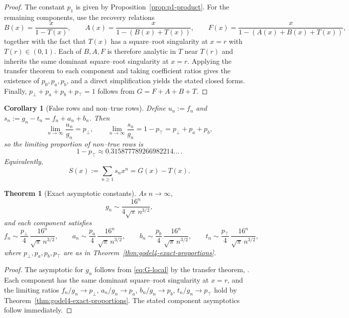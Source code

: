 \documentclass[11pt]{article}
\newtheorem{corollary}{Corollary}
\newtheorem{theorem}{Theorem}
\newcommand{\ptop}{p_{\top}}
\newcommand{\pbot}{p_{\bot}}
\begin{document}
\begin{proof}
The constant \(p_1\) is given by Proposition~\ref{prop:p1-product}.
For the remaining components, use the recovery relations
\[
B(x)=\frac{x}{1-T(x)},\qquad
A(x)=\frac{x}{1-(B(x)+T(x))},\qquad
F(x)=\frac{x}{1-(A(x)+B(x)+T(x))},
\]
together with the fact that \(T(x)\) has a square--root singularity at \(x=r\) with
\(T(r)\in(0,1)\). Each of \(B,A,F\) is therefore analytic in \(T\) near \(T(r)\) and inherits
the same dominant square--root singularity at \(x=r\). Applying the transfer theorem to
each component and taking coefficient ratios gives the existence of \(p_0,p_a,p_b\), and a
direct simplification yields the stated closed forms. Finally,
\(\pbot +p_a+p_b+\ptop =1\) follows from \(G=F+A+B+T\).
\end{proof}

\begin{corollary}[False rows and non--true rows]\label{cor:false-rows-godel4}
Define \(u_n:=f_n\) and \(s_n:=g_n-t_n=f_n+a_n+b_n\). Then
\[
\lim_{n\to\infty}\frac{u_n}{g_n}=\pbot,
\qquad
\lim_{n\to\infty}\frac{s_n}{g_n}=1-\ptop=\pbot+p_a+p_b,
\]
so the limiting proportion of non--true rows is
\[
1-\ptop \approx 0.315877789266982214\ldots\, .
\]
Equivalently,
\[
S(x):=\sum_{n\ge1}s_nx^n=G(x)-T(x).
\]
\end{corollary}

\begin{theorem}[Exact asymptotic constants]\label{thm:godel4-exact-asymptotics}
As \(n\to\infty\),
\[
g_n\sim \frac{16^n}{4\sqrt{\pi}\,n^{3/2}},
\]
and each component satisfies
\[
f_n\sim \frac{\pbot}{4}\,\frac{16^n}{\sqrt{\pi}\,n^{3/2}},\qquad
a_n\sim \frac{p_a}{4}\,\frac{16^n}{\sqrt{\pi}\,n^{3/2}},\qquad
b_n\sim \frac{p_b}{4}\,\frac{16^n}{\sqrt{\pi}\,n^{3/2}},\qquad
t_n\sim \frac{\ptop}{4}\,\frac{16^n}{\sqrt{\pi}\,n^{3/2}},
\]
where \(\pbot, p_a,p_b,\ptop \) are as in Theorem~\ref{thm:godel4-exact-proportions}.
\end{theorem}

\begin{proof}
The asymptotic for \(g_n\) follows from \eqref{eq:G-local} by the transfer theorem, \cite[Chapter.~VI]{FlajoletSedgewick2009}.
Each component has the same dominant square--root singularity at \(x=r\), and the limiting
ratios \(f_n/g_n\to \pbot \), \(a_n/g_n\to p_a\), \(b_n/g_n\to p_b\), \(t_n/g_n\to \ptop \) hold by
Theorem~\ref{thm:godel4-exact-proportions}. The stated component asymptotics follow
immediately.
\end{proof}
\end{document}
